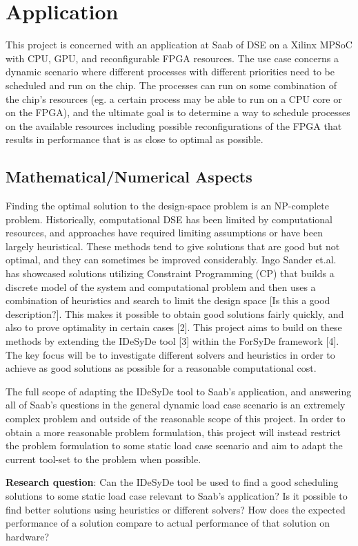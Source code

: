 \documentclass[12pt,notitlepage]{article}
\begin{document}
\section{Application}
This project is concerned with an application at Saab of DSE on a Xilinx MPSoC with CPU, GPU, and reconfigurable FPGA resources. The use case concerns a dynamic scenario where different processes with different priorities need to be scheduled and run on the chip. The processes can run on some combination of the chip's resources (eg. a certain process may be able to run on a CPU core or on the FPGA), and the ultimate goal is to determine a way to schedule processes on the available resources including possible reconfigurations of the FPGA that results in performance that is as close to optimal as possible.

\subsection{Mathematical/Numerical Aspects}
Finding the optimal solution to the design-space problem is an NP-complete problem. Historically, computational DSE has been limited by computational resources, and approaches have required limiting assumptions or have been largely heuristical. These methods tend to give solutions that are good but not optimal, and they can sometimes be improved considerably. Ingo Sander et.al. has showcased solutions utilizing Constraint Programming (CP) that builds a discrete model of the system and computational problem and then uses a combination of heuristics and search to limit the design space [Is this a good description?]. This makes it possible to obtain good solutions fairly quickly, and also to prove optimality in certain cases [2]. This project aims to build on these methods by extending the IDeSyDe tool [3] within the ForSyDe framework [4]. The key focus will be to investigate different solvers and heuristics in order to achieve as good solutions as possible for a reasonable computational cost.

The full scope of adapting the IDeSyDe tool to Saab's application, and answering all of Saab's questions in the general dynamic load case scenario is an extremely complex problem and outside of the reasonable scope of this project. In order to obtain a more reasonable problem formulation, this project will instead restrict the problem formulation to some static load case scenario and aim to adapt the current tool-set to the problem when possible.

\textbf{Research question}: Can the IDeSyDe tool be used to find a good scheduling solutions to some static load case relevant to Saab's application? Is it possible to find better solutions using heuristics or different solvers? How does the expected performance of a solution compare to actual performance of that solution on hardware?
\end{document}
